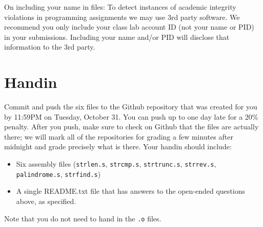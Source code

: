 \documentclass{article}
\begin{document}
On including your name in files: To detect instances of academic integrity
violations in programming assignments we may use 3rd party software.  We
recommend you only include your class lab account ID (not your name or PID) in
your submissions.  Including your name and/or PID will disclose that
information to the 3rd party.
\section{Handin}
Commit and push the six files to the Github repository that was created
for you by 11:59PM on Tuesday, October 31. You can push up to one day late for
a 20\% penalty. After you push, make sure to check on Github that the files are
actually there; we will mark all of the repositories for grading a few minutes
after midnight and grade precisely what is there.
Your handin should include:
\begin{itemize}
\item Six assembly files ({\tt strlen.s}, {\tt strcmp.s}, {\tt strtrunc.s}, {\tt strrev.s}, {\tt palindrome.s}, {\tt strfind.s})
\item A single README.txt file that has answers to the open-ended questions
above, as specified.
\end{itemize}
Note that you do not need to hand in the {\tt .o} files.
\end{document}
